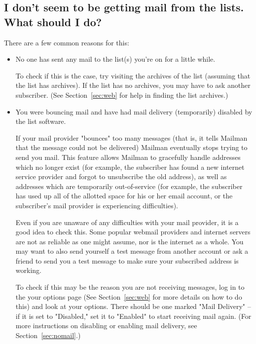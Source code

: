 \documentclass{howto}
\begin{document}
\subsection{I don't seem to be getting mail from the lists.  What should
	I do?}
There are a few common reasons for this:
\begin{itemize}
	\item No one has sent any mail to the list(s) you're on for a little while.

	To check if this is the case, try visiting the archives of the list 
	(assuming that the list has archives).  If the list has no archives, you
	may have to ask another subscriber.  (See Section~\ref{sec:web} for help
	in finding the list archives.)


	\item You were bouncing mail and have had mail delivery (temporarily) 
	disabled by the list software.

	If your mail provider "bounces" too many messages (that is, it tells
	Mailman that the message could not be delivered)
	Mailman eventually stops trying to send you mail.  This feature allows
	Mailman to gracefully handle addresses which no longer exist (for example,
	the subscriber has found a new internet service provider and forgot to 
	unsubscribe the old address), as well
	as addresses which are temporarily out-of-service (for example, the 
	subscriber has used up all of the allotted space for his or her email
	account, or the subscriber's mail provider is experiencing difficulties).

	Even if you are unaware of any difficulties with your mail provider, it 
	is a good idea to check this.  Some popular webmail providers and 
	internet servers are not as reliable as one might assume, nor is the
	internet as a whole.  You may want to also send yourself a test message
	from another account or ask a friend to send you a test message to make
	sure your subscribed address is working.

	To check if this may be the reason you are not receiving messages, log in 
	to the your options page (See
	Section~\ref{sec:web} for more details on how to do this) and 
	look at your options.  There should be one marked "Mail Delivery" --
	if it is set to "Disabled," set it to "Enabled" to start receiving mail
	again. (For more instructions on disabling or enabling mail delivery,
	see Section~\ref{sec:nomail}.)


\end{itemize}
\end{document}
